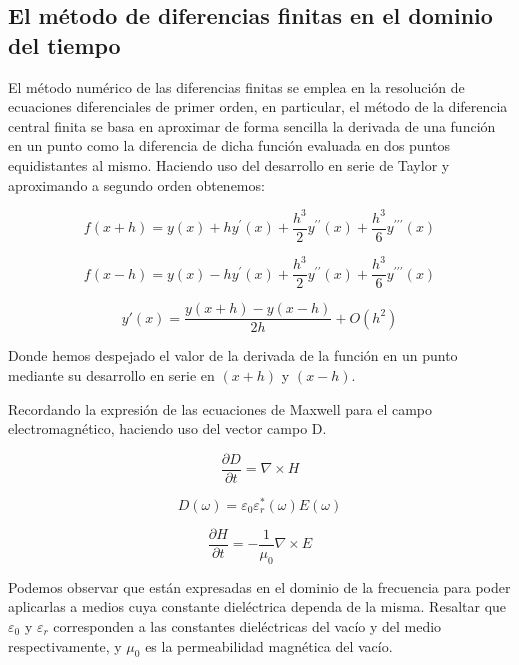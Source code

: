 \documentclass[11pt,a4paper,twoside,pdf]{article}
\numberwithin{equation}{section}
\begin{document}
\subsection{El método de diferencias finitas en el dominio del tiempo}
El método numérico de las diferencias finitas se emplea en la resolución de ecuaciones diferenciales de primer orden, en particular, el método de la diferencia central finita se basa en aproximar de forma sencilla la derivada de una función en un punto como la diferencia de dicha función evaluada en dos puntos equidistantes al mismo. Haciendo uso del desarrollo en serie de Taylor y aproximando a segundo orden obtenemos:

\begin{equation}
f(x+h)=y(x)+hy^\prime(x)+\frac{h^3}{2}y^{\prime\prime}(x)+\frac{h^3}{6}y^{\prime\prime\prime}(x)
\end{equation}

\begin{equation}
f(x-h)=y(x)-hy^\prime(x)+\frac{h^3}{2}y^{\prime\prime}(x)+\frac{h^3}{6}y^{\prime\prime\prime}(x)
\end{equation}

\begin{equation}
y\prime(x)=\frac{y(x+h)-y(x-h)}{2h}+O(h^2)
\end{equation}

Donde hemos despejado el valor de la derivada de la función en un punto mediante su desarrollo en serie en $(x+h)$ y $(x-h)$.

Recordando la expresión de las ecuaciones de Maxwell para el campo electromagnético, haciendo uso del vector campo D.

\begin{equation}
\frac{\partial D}{\partial t}=\nabla \times H
\end{equation}

\begin{equation}
D(\omega)=\varepsilon_{0}\varepsilon^*_{r}(\omega)E(\omega)
\end{equation}

\begin{equation}
\frac{\partial H}{\partial t}=-\frac{1}{\mu_{0}}\nabla \times E
\end{equation}

Podemos observar que están expresadas en el dominio de la frecuencia para poder aplicarlas a medios cuya constante dieléctrica dependa de la misma. Resaltar que $\varepsilon_{0}$ y $\varepsilon_{r}$ corresponden a las constantes dieléctricas del vacío y del medio respectivamente, y $\mu_{0}$ es la permeabilidad magnética del vacío.
\end{document}
